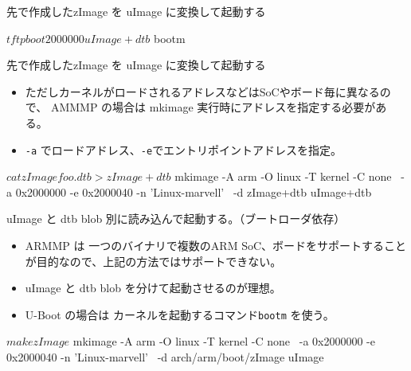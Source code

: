 \begin{frame}[containsverbatim]{先で作成したzImage を uImage に変換して起動する}

\begin{commandline}
$ tftpboot 2000000 uImage+dtb
$ bootm
\end{commandline}
\end{frame}

\begin{frame}[containsverbatim]{先で作成したzImage を uImage に変換して起動する}
\begin{itemize}

\item ただしカーネルがロードされるアドレスなどはSoCやボード毎に異なるので、 AMMMP の場合は mkimage
実行時にアドレスを指定する必要がある。
\item \texttt{-a} でロードアドレス、\texttt{-e}でエントリポイントアドレスを指定。
\end{itemize}

\begin{commandline}
$ cat zImage foo.dtb > zImage+dtb 
$ mkimage -A arm -O linux -T kernel -C none \
  -a 0x2000000 -e 0x2000040 -n 'Linux-marvell' \
  -d zImage+dtb uImage+dtb
\end{commandline}
\end{frame}

\begin{frame}[containsverbatim]{uImage と dtb blob 別に読み込んで起動する。（ブートローダ依存）}

\begin{itemize}
\item  ARMMP は 一つのバイナリで複数のARM SoC、ボードをサポートすることが目的なので、上記の方法ではサポートできない。
\item uImage と dtb blob を分けて起動させるのが理想。
\item U-Boot の場合は カーネルを起動するコマンド\texttt{bootm} を使う。
\end{itemize}

\begin{commandline}
$ make zImage
$ mkimage -A arm -O linux -T kernel -C none \
  -a 0x2000000 -e 0x2000040 -n 'Linux-marvell' \
  -d arch/arm/boot/zImage uImage
\end{commandline}

\end{frame}

